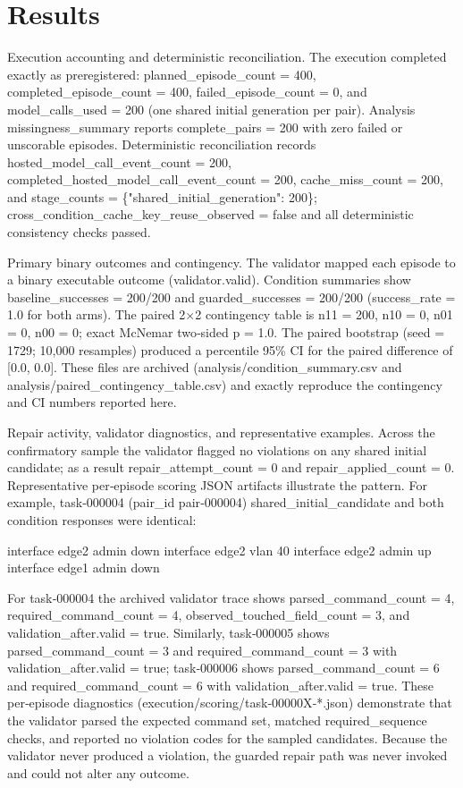 \documentclass[conference]{IEEEtran}
\begin{document}
\section{Results}
Execution accounting and deterministic reconciliation. The execution completed exactly as preregistered: planned\_episode\_count = 400, completed\_episode\_count = 400, failed\_episode\_count = 0, and model\_calls\_used = 200 (one shared initial generation per pair). Analysis missingness\_summary reports complete\_pairs = 200 with zero failed or unscorable episodes. Deterministic reconciliation records hosted\_model\_call\_event\_count = 200, completed\_hosted\_model\_call\_event\_count = 200, cache\_miss\_count = 200, and stage\_counts = \{"shared\_initial\_generation": 200\}; cross\_condition\_cache\_key\_reuse\_observed = false and all deterministic consistency checks passed.

Primary binary outcomes and contingency. The validator mapped each episode to a binary executable outcome (validator.valid). Condition summaries show baseline\_successes = 200/200 and guarded\_successes = 200/200 (success\_rate = 1.0 for both arms). The paired 2\ensuremath{\times}2 contingency table is n11 = 200, n10 = 0, n01 = 0, n00 = 0; exact McNemar two‑sided p = 1.0. The paired bootstrap (seed = 1729; 10,000 resamples) produced a percentile 95\% CI for the paired difference of [0.0, 0.0]. These files are archived (analysis/condition\_summary.csv and analysis/paired\_contingency\_table.csv) and exactly reproduce the contingency and CI numbers reported here.

Repair activity, validator diagnostics, and representative examples. Across the confirmatory sample the validator flagged no violations on any shared initial candidate; as a result repair\_attempt\_count = 0 and repair\_applied\_count = 0. Representative per‑episode scoring JSON artifacts illustrate the pattern. For example, task‑000004 (pair\_id pair‑000004) shared\_initial\_candidate and both condition responses were identical:

interface edge2 admin down
interface edge2 vlan 40
interface edge2 admin up
interface edge1 admin down

For task‑000004 the archived validator trace shows parsed\_command\_count = 4, required\_command\_count = 4, observed\_touched\_field\_count = 3, and validation\_after.valid = true. Similarly, task‑000005 shows parsed\_command\_count = 3 and required\_command\_count = 3 with validation\_after.valid = true; task‑000006 shows parsed\_command\_count = 6 and required\_command\_count = 6 with validation\_after.valid = true. These per‑episode diagnostics (execution/scoring/task‑00000X‑*.json) demonstrate that the validator parsed the expected command set, matched required\_sequence checks, and reported no violation codes for the sampled candidates. Because the validator never produced a violation, the guarded repair path was never invoked and could not alter any outcome.
\end{document}
